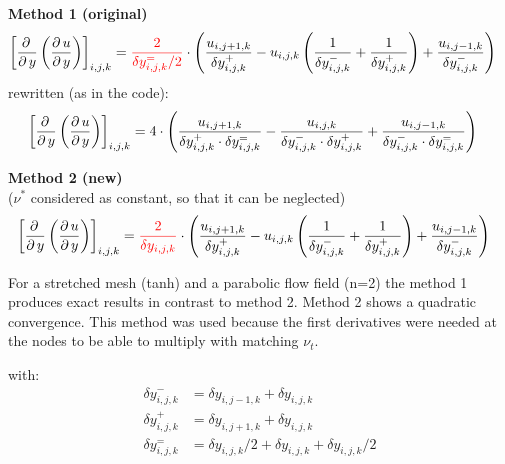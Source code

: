 \documentclass[11pt,a4paper]{article}
\begin{document}
\noindent\textbf{Method 1 (original)}
\begin{align*}
\left[ \frac{\partial \, }{\partial \, y}\left( \frac{\partial \, u}{\partial \, y} \right) \right]_{i,j,k}&=
\textcolor{red}{
\frac{2}{\delta y_{i,j,k}^=/2}
}
\cdot
\left(
\frac{u_{i,j+1,k}}{\delta y_{i,j,k}^+}
-
u_{i,j,k}\left(
\frac{1}{\delta y_{i,j,k}^-}
+
\frac{1}{\delta y_{i,j,k}^+} \right)
+
\frac{u_{i,j-1,k}}{\delta y_{i,j,k}^-}
\right)
\end{align*}
rewritten (as in the code):
\begin{align*}
\left[ \frac{\partial \, }{\partial \, y}\left( \frac{\partial \, u}{\partial \, y} \right) \right]_{i,j,k}
&=
4
\cdot
\left(
\frac{u_{i,j+1,k}}{\delta y_{i,j,k}^+\cdot \delta y_{i,j,k}^=}
-
\frac{
u_{i,j,k}
}{
\delta y_{i,j,k}^-\cdot \delta y_{i,j,k}^+
}
+
\frac{u_{i,j-1,k}}{\delta y_{i,j,k}^-\cdot \delta y_{i,j,k}^=}
\right)
\end{align*}

\vspace{0.5cm}

\noindent\textbf{Method 2 (new)}\\
\noindent($\nu^*$ considered as constant, so that it can be neglected)
\begin{align*}
&\left[ \frac{\partial \, }{\partial \, y}\left( \frac{\partial \, u}{\partial \, y} \right) \right]_{i,j,k}=
\textcolor{red}{
\frac{2}{\delta y_{i,j,k}}
}\cdot
\left(
\frac{u_{i,j+1,k}}{\delta y_{i,j,k}^+}
-
u_{i,j,k}\left(
\frac{1}{\delta y_{i,j,k}^-}
+
\frac{1}{\delta y_{i,j,k}^+} \right)
+
\frac{u_{i,j-1,k}}{\delta y_{i,j,k}^-}
\right)
\end{align*}

\vspace{0.5cm}

\noindent For a stretched mesh (tanh) and a parabolic flow field (n=2) the method 1 produces exact results in contrast to method 2. Method 2 shows a quadratic convergence. This method was used because the first derivatives were needed at the nodes to be able to multiply with matching $\nu_t$.

\vfill
with:
\begin{align*}
\delta y_{i,j,k}^- &= \delta y_{i,j-1,k}+\delta y_{i,j,k} \\
\delta y_{i,j,k}^+ &= \delta y_{i,j+1,k}+\delta y_{i,j,k} \\
\delta y_{i,j,k}^=&=\delta y_{i,j,k}/2+ \delta y_{i,j,k}+\delta y_{i,j,k}/2
\end{align*}

\clearpage
\end{document}
